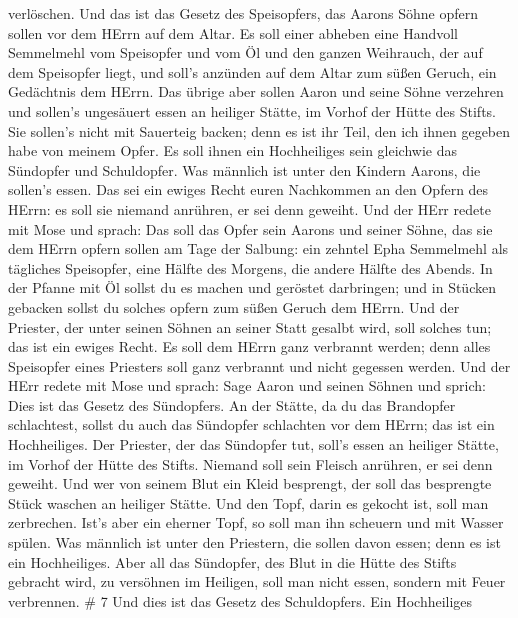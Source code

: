 verlöschen.  Und das ist das Gesetz des Speisopfers, das
Aarons Söhne opfern sollen vor dem HErrn auf dem Altar.  Es
soll einer abheben eine Handvoll Semmelmehl vom Speisopfer und vom Öl
und den ganzen Weihrauch, der auf dem Speisopfer liegt, und soll's
anzünden auf dem Altar zum süßen Geruch, ein Gedächtnis dem HErrn.
 Das übrige aber sollen Aaron und seine Söhne verzehren und
sollen's ungesäuert essen an heiliger Stätte, im Vorhof der Hütte des
Stifts.  Sie sollen's nicht mit Sauerteig backen; denn es
ist ihr Teil, den ich ihnen gegeben habe von meinem Opfer. Es soll ihnen
ein Hochheiliges sein gleichwie das Sündopfer und Schuldopfer.
 Was männlich ist unter den Kindern Aarons, die sollen's
essen. Das sei ein ewiges Recht euren Nachkommen an den Opfern des
HErrn: es soll sie niemand anrühren, er sei denn geweiht. 
Und der HErr redete mit Mose und sprach:  Das soll das
Opfer sein Aarons und seiner Söhne, das sie dem HErrn opfern sollen am
Tage der Salbung: ein zehntel Epha Semmelmehl als tägliches Speisopfer,
eine Hälfte des Morgens, die andere Hälfte des Abends.  In
der Pfanne mit Öl sollst du es machen und geröstet darbringen; und in
Stücken gebacken sollst du solches opfern zum süßen Geruch dem HErrn.
 Und der Priester, der unter seinen Söhnen an seiner Statt
gesalbt wird, soll solches tun; das ist ein ewiges Recht. Es soll dem
HErrn ganz verbrannt werden;  denn alles Speisopfer eines
Priesters soll ganz verbrannt und nicht gegessen werden. 
Und der HErr redete mit Mose und sprach:  Sage Aaron und
seinen Söhnen und sprich: Dies ist das Gesetz des Sündopfers. An der
Stätte, da du das Brandopfer schlachtest, sollst du auch das Sündopfer
schlachten vor dem HErrn; das ist ein Hochheiliges.  Der
Priester, der das Sündopfer tut, soll's essen an heiliger Stätte, im
Vorhof der Hütte des Stifts.  Niemand soll sein Fleisch
anrühren, er sei denn geweiht. Und wer von seinem Blut ein Kleid
besprengt, der soll das besprengte Stück waschen an heiliger Stätte.
 Und den Topf, darin es gekocht ist, soll man zerbrechen.
Ist's aber ein eherner Topf, so soll man ihn scheuern und mit Wasser
spülen.  Was männlich ist unter den Priestern, die sollen
davon essen; denn es ist ein Hochheiliges.  Aber all das
Sündopfer, des Blut in die Hütte des Stifts gebracht wird, zu versöhnen
im Heiligen, soll man nicht essen, sondern mit Feuer verbrennen. \# 7
 Und dies ist das Gesetz des Schuldopfers. Ein Hochheiliges

